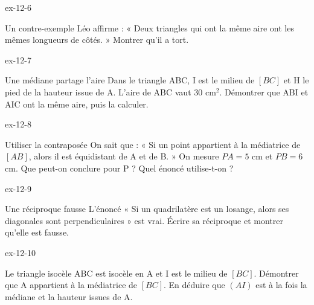 \begin{blocLivre}{ex-12-6}\begin{exercice}[2]{Un contre-exemple}
Léo affirme : « Deux triangles qui ont la même aire ont les mêmes longueurs de côtés. » Montrer qu’il a tort.
\label{fig-ex-12-6}
\end{exercice}\end{blocLivre}
\begin{blocLivre}{ex-12-7}\begin{exercice}[2]{Une médiane partage l’aire}
Dans le triangle ABC, I est le milieu de $[BC]$ et H le pied de la hauteur issue de A. L’aire de ABC vaut 30 cm$^2$. Démontrer que ABI et AIC ont la même aire, puis la calculer.
\label{fig-ex-12-7}
\end{exercice}\end{blocLivre}
\begin{blocLivre}{ex-12-8}\begin{exercice}[2]{Utiliser la contraposée}
On sait que : « Si un point appartient à la médiatrice de $[AB]$, alors il est équidistant de A et de B. » On mesure $PA=5$ cm et $PB=6$ cm. Que peut-on conclure pour P ? Quel énoncé utilise-t-on ?
\label{fig-ex-12-8}
\end{exercice}\end{blocLivre}
\begin{blocLivre}{ex-12-9}\begin{exercice}[2]{Une réciproque fausse}
L’énoncé « Si un quadrilatère est un losange, alors ses diagonales sont perpendiculaires » est vrai. Écrire sa réciproque et montrer qu’elle est fausse.
\label{fig-ex-12-9}
\end{exercice}\end{blocLivre}
\begin{blocLivre}{ex-12-10}\begin{exercice}[2]{Le triangle isocèle}
ABC est isocèle en A et I est le milieu de $[BC]$. Démontrer que A appartient à la médiatrice de $[BC]$. En déduire que $(AI)$ est à la fois la médiane et la hauteur issues de A.
\label{fig-ex-12-10}
\end{exercice}\end{blocLivre}

